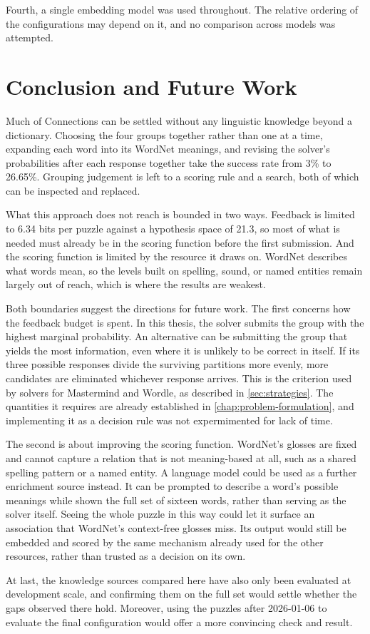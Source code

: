 Fourth, a single embedding model was used throughout. The relative ordering of the configurations may depend on it, and no comparison across models was attempted.

\section{Conclusion and Future Work}
\label{sec:conclusion}

Much of Connections can be settled without any linguistic knowledge beyond a dictionary. Choosing the four groups together rather than one at a time, expanding each word into its WordNet meanings, and revising the solver's probabilities after each response together take the success rate from 3\% to 26.65\%. Grouping judgement is left to a scoring rule and a search, both of which can be inspected and replaced.

What this approach does not reach is bounded in two ways. Feedback is limited to 6.34 bits per puzzle against a hypothesis space of 21.3, so most of what is needed must already be in the scoring function before the first submission. And the scoring function is limited by the resource it draws on. WordNet describes what words mean, so the levels built on spelling, sound, or named entities remain largely out of reach, which is where the results are weakest.

Both boundaries suggest the directions for future work. The first concerns how the feedback budget is spent. In this thesis, the solver submits the group with the highest marginal probability. An alternative can be submitting the group that yields the most information, even where it is unlikely to be correct in itself. If its three possible responses divide the surviving partitions more evenly, more candidates are eliminated whichever response arrives. This is the criterion used by solvers for Mastermind and Wordle, as described in \autoref{sec:strategies}. The quantities it requires are already established in \autoref{chap:problem-formulation}, and implementing it as a decision rule was not expermimented for lack of time.

The second is about improving the scoring function. WordNet's glosses are fixed and cannot capture a relation that is not meaning-based at all, such as a shared spelling pattern or a named entity. A language model could be used as a further enrichment source instead. It can be prompted to describe a word's possible meanings while shown the full set of sixteen words, rather than serving as the solver itself. Seeing the whole puzzle in this way could let it surface an association that WordNet's context-free glosses miss. Its output would still be embedded and scored by the same mechanism already used for the other resources, rather than trusted as a decision on its own.

At last, the knowledge sources compared here have also only been evaluated at development scale, and confirming them on the full set would settle whether the gaps observed there hold. Moreover, using the puzzles after 2026-01-06 to evaluate the final configuration would offer a more convincing check and result.